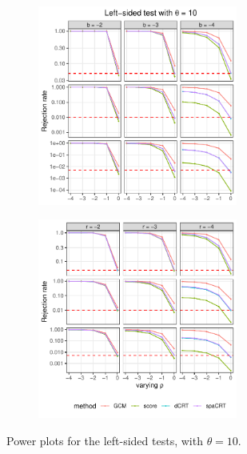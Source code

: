 \documentclass[12pt]{article}
\theoremstyle{definition}
\begin{document}
\begin{figure}
  \centering

  \begin{subfigure}{\textwidth}
    \centering
    \includegraphics[width=0.72\textwidth]{figures-and-tables/simulation/power/plot-bin-NB-normal-B-50000-n-5000-5e3-n5-n5-disp-10-power-fixed-gamma-LEFT.pdf}
  \end{subfigure}

  \begin{subfigure}{\textwidth}
    \centering
    \includegraphics[width=0.72\textwidth]{figures-and-tables/simulation/power/plot-bin-NB-normal-B-50000-n-5000-5e3-n5-n5-disp-10-power-fixed-beta-LEFT.pdf}
  \end{subfigure}

  \caption{Power plots for the left-sided tests, with $\theta = 10$.}
  \label{fig:simulation-power-LEFT-10}
\end{figure}
\end{document}

